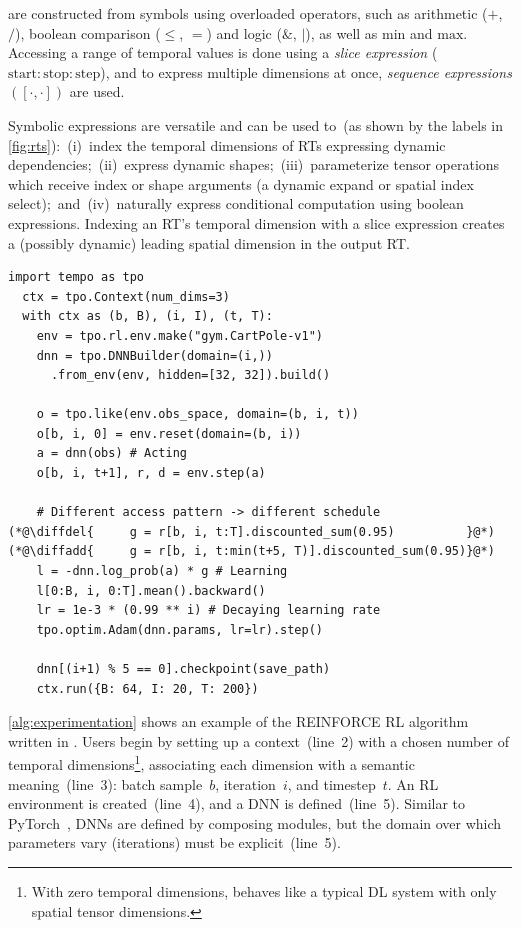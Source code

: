  are constructed from symbols using overloaded operators, such as arithmetic (\eg $+$, $/$), boolean comparison (\eg $\leq$, $=$) and logic (\eg $\&$, $|$), as well as $\text{min}$ and $\text{max}$. Accessing a range of temporal values is done using a \emph{slice expression} ({$\mathrm{start}\!:\!\mathrm{stop}\!:\!\mathrm{step}$}), and to express multiple dimensions at once, \emph{sequence expressions} $([\cdot,\cdot])$ are used.

Symbolic expressions are versatile and can be used to~(as shown by the labels in \F\ref{fig:rts}):~(i)~index the temporal dimensions of RTs expressing dynamic dependencies;~(ii)~express dynamic shapes;~(iii)~parameterize tensor operations which receive index or shape arguments (\eg a dynamic expand or spatial index select);~and~(iv)~naturally express conditional computation using boolean expressions. 
Indexing an RT’s temporal dimension with a slice expression creates a (possibly dynamic) leading spatial dimension in the output RT.


\begin{algorithm}[t]
  \caption{REINFORCE using RTs. \textnormal{(Line 13 is discussed later.)}}
  \label{alg:experimentation}
\begin{lstlisting}[style=diffpython, linewidth=\columnwidth]
  import tempo as tpo
  ctx = tpo.Context(num_dims=3)
  with ctx as (b, B), (i, I), (t, T):
    env = tpo.rl.env.make("gym.CartPole-v1")
    dnn = tpo.DNNBuilder(domain=(i,))
      .from_env(env, hidden=[32, 32]).build()

    o = tpo.like(env.obs_space, domain=(b, i, t))
    o[b, i, 0] = env.reset(domain=(b, i))
    a = dnn(obs) # Acting
    o[b, i, t+1], r, d = env.step(a)

    # Different access pattern -> different schedule
(*@\diffdel{     g = r[b, i, t:T].discounted_sum(0.95)          }@*)
(*@\diffadd{     g = r[b, i, t:min(t+5, T)].discounted_sum(0.95)}@*)
    l = -dnn.log_prob(a) * g # Learning 
    l[0:B, i, 0:T].mean().backward() 
    lr = 1e-3 * (0.99 ** i) # Decaying learning rate
    tpo.optim.Adam(dnn.params, lr=lr).step()

    dnn[(i+1) % 5 == 0].checkpoint(save_path)
    ctx.run({B: 64, I: 20, T: 200})
\end{lstlisting}
\end{algorithm}

 \A\ref{alg:experimentation} shows an example of the REINFORCE RL algorithm~\cite{williams1992simple} written in \sys. Users begin by setting up a context~(line~2) with a chosen number of temporal dimensions\footnote{With zero temporal dimensions, \sys behaves like a typical DL system with only spatial tensor dimensions.}, associating each dimension with a semantic meaning~(line~3): batch sample~$b$, iteration~$i$, and timestep~$t$. An RL environment is created~(line~4), and a DNN is defined~(line~5). Similar to PyTorch~\cite{paszke2019pytorch}, DNNs are defined by composing modules, but the domain over which parameters vary (iterations) must be explicit~(line~5). 

